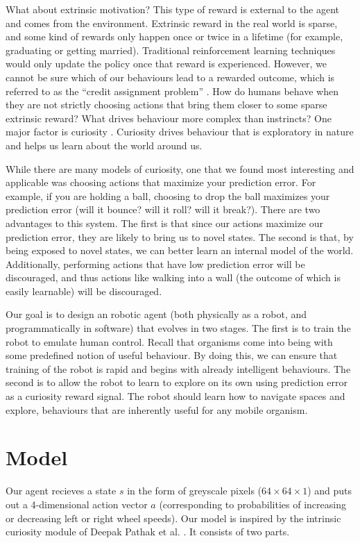 \documentclass[conference, 12pt]{IEEEtran} %
\begin{document}
	\par What about extrinsic motivation? This type of reward is external to the agent and comes from the environment. Extrinsic reward in the real world is sparse, and some kind of rewards only happen once or twice in a lifetime (for example, graduating or getting married). Traditional reinforcement learning techniques would only update the policy once that reward is experienced. However, we cannot be sure which of our behaviours lead to a rewarded outcome, which is referred to as the ``credit assignment problem'' \cite{credit}. How do humans behave when they are not strictly choosing actions that bring them closer to some sparse extrinsic reward? What drives behaviour more complex than instrincts? One major factor is curiosity \cite{curiosityrat}. Curiosity drives behaviour that is exploratory in nature and helps us learn about the world around us.
	\par While there are many models of curiosity, one that we found most interesting and applicable was choosing actions that maximize your prediction error. For example, if you are holding a ball, choosing to drop the ball maximizes your prediction error (will it bounce? will it roll? will it break?). There are two advantages to this system. The first is that since our actions maximize our prediction error, they are likely to bring us to novel states. The second is that, by being exposed to novel states, we can better learn an internal model of the world. Additionally, performing actions that have low prediction error will be discouraged, and thus actions like walking into a wall (the outcome of which is easily learnable) will be discouraged.
	\par Our goal is to design an robotic agent (both physically as a robot, and programmatically in software) that evolves in two stages. The first is to train the robot to emulate human control. Recall that organisms come into being with some predefined notion of useful behaviour. By doing this, we can ensure that training of the robot is rapid and begins with already intelligent behaviours. The second is to allow the robot to learn to explore on its own using prediction error as a curiosity reward signal. The robot should learn how to navigate spaces and explore, behaviours that are inherently useful for any mobile organism.

	\section{Model}
	\par Our agent recieves a state $s$ in the form of greyscale pixels ($64 \times 64 \times 1$) and puts out a 4-dimensional action vector $a$ (corresponding to probabilities of increasing or decreasing left or right wheel speeds). Our model is inspired by the intrinsic curiosity module of Deepak Pathak et al. \cite{ICM}. It consists of two parts.
\end{document}
